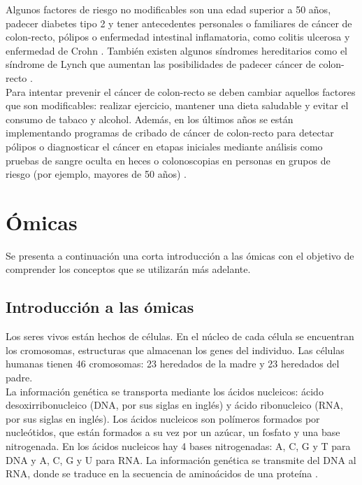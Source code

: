 Algunos factores de riesgo no modificables son una edad superior a 50 años, padecer diabetes tipo 2 y tener antecedentes personales o familiares de cáncer de colon-recto, pólipos o enfermedad intestinal inflamatoria, como colitis ulcerosa y enfermedad de Crohn \cite{AmericanCancerSociety2020}. También existen algunos síndromes hereditarios como el síndrome de Lynch que aumentan las posibilidades de padecer cáncer de colon-recto \cite{Lynch2003}.\\

Para intentar prevenir el cáncer de colon-recto se deben cambiar aquellos factores que son modificables: realizar ejercicio, mantener una dieta saludable y evitar el consumo de tabaco y alcohol. Además, en los últimos años se están implementando programas de cribado de cáncer de colon-recto para detectar pólipos o diagnosticar el cáncer en etapas iniciales mediante análisis como pruebas de sangre oculta en heces o colonoscopias en personas en grupos de riesgo (por ejemplo, mayores de 50 años) \cite{Levin2008}.


\section{Ómicas}

Se presenta a continuación una corta introducción a las ómicas con el objetivo de comprender los conceptos que se utilizarán más adelante.

\subsection{Introducción a las ómicas}

Los seres vivos están hechos de células. En el núcleo de cada célula se encuentran los cromosomas, estructuras que almacenan los genes del individuo. Las células humanas tienen 46 cromosomas: 23 heredados de la madre y 23 heredados del padre.\\

La información genética se transporta mediante los ácidos nucleicos: ácido desoxirribonucleico (DNA, por sus siglas en inglés) y ácido ribonucleico (RNA, por sus siglas en inglés). Los ácidos nucleicos son polímeros formados por nucleótidos, que están formados a su vez por un azúcar, un fosfato y una base nitrogenada. En los ácidos nucleicos hay 4 bases nitrogenadas: A, C, G y T para DNA y A, C, G y U para RNA. La información genética se transmite del DNA al RNA, donde se traduce en la secuencia de aminoácidos de una proteína \cite{Pierce2010}.\\

